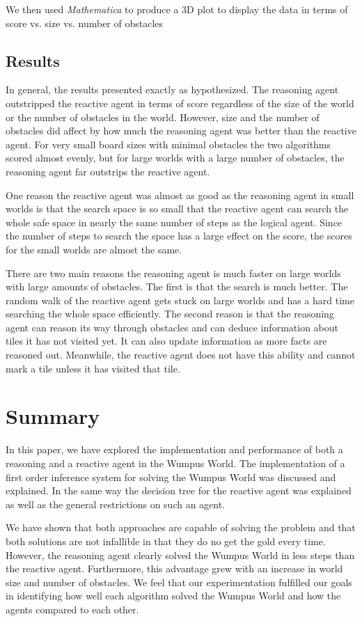 \documentclass{article}
\begin{document}
	We then used \textit{Mathematica}  to produce a 3D plot to display the data in terms of score vs. size vs. number of obstacles
	
	\subsection{Results}
		In general, the results presented exactly as hypothesized. The reasoning agent outstripped the reactive agent in terms of score regardless of the size of the world or the number of obstacles in the world. 
		However, size and the number of obstacles did affect by how much the reasoning agent was better than the reactive agent. 
		For very small board sizes with minimal obstacles the two algorithms scored almost evenly, but for large worlds with a  large number of obstacles, the reasoning agent far outstrips the reactive agent.
		
		One reason the reactive agent was almost as good as the reasoning agent in small worlds is that the search space is so small that the reactive agent can search the whole safe space in nearly the same number of steps as the logical agent.
	 Since the number of steps to search the space has a large effect on the score, the scores for the small worlds are almost the same. 
		
		There are two main reasons the reasoning agent is much faster on large worlds with large amounts of obstacles.
		 The first is that the search is much better.
		  The random walk of the reactive agent gets stuck on large worlds and has a hard time searching the whole space efficiently.
		   The second reason is that the reasoning agent can reason its way through obstacles and can deduce information about tiles it has not visited yet.
		    It can also update information as more facts are reasoned out.
		     Meanwhile, the reactive agent does not have this ability and cannot mark a tile unless it has visited that tile.
	
\section{Summary}
In this paper, we have explored the implementation and performance of both a reasoning and a reactive agent in the Wumpus World. The implementation of a first order inference system for solving the Wumpus World was discussed and explained. In the same way the decision tree for the reactive agent was explained as well as the general restrictions on such an agent.

We have shown that both approaches are capable of solving the problem and that both solutions are not infallible in that they do no get the gold every time. However, the reasoning agent clearly solved the Wumpus World in less steps than the reactive agent. Furthermore, this advantage grew with an increase in world size and number of obstacles. We feel that our experimentation fulfilled our goals in identifying how well each algorithm solved the Wumpus World and how the agents compared to each other.


	

	\pagebreak


	
	
	
\end{document}
